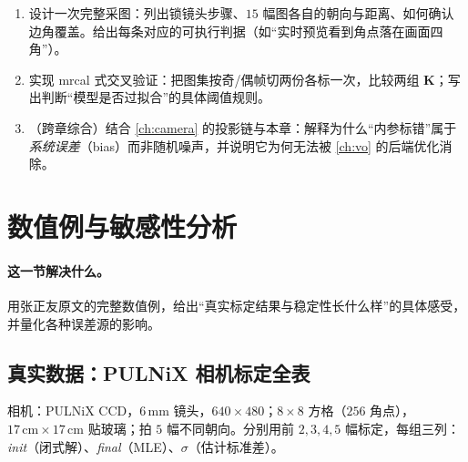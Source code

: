 \begin{practice}[练习]
\begin{enumerate}
  \item 设计一次完整采图：列出锁镜头步骤、$15$ 幅图各自的朝向与距离、如何确认边角覆盖。给出每条对应的可执行判据（如“实时预览看到角点落在画面四角”）。
  \item 实现 mrcal 式交叉验证：把图集按奇/偶帧切两份各标一次，比较两组 $\mathbf{K}$；写出判断“模型是否过拟合”的具体阈值规则。
  \item （跨章综合）结合 \cref{ch:camera} 的投影链与本章：解释为什么“内参标错”属于\emph{系统误差}（bias）而非随机噪声，并说明它为何无法被 \cref{ch:vo} 的后端优化消除。
\end{enumerate}
\end{practice}

\section{数值例与敏感性分析}
\label{sec:calib-numerical}

\paragraph{这一节解决什么。}
用张正友原文的完整数值例\cite{zhang2000calibration}，给出“真实标定结果与稳定性长什么样”的具体感受，并量化各种误差源的影响。

\subsection{真实数据：PULNiX 相机标定全表}

相机：PULNiX CCD，$6\,\mathrm{mm}$ 镜头，$640\times480$；$8\times8$ 方格（$256$ 角点），$17\,\mathrm{cm}\times17\,\mathrm{cm}$ 贴玻璃；拍 $5$ 幅不同朝向。分别用前 $2,3,4,5$ 幅标定，每组三列：\emph{init}（闭式解）、\emph{final}（MLE）、$\sigma$（估计标准差）。

